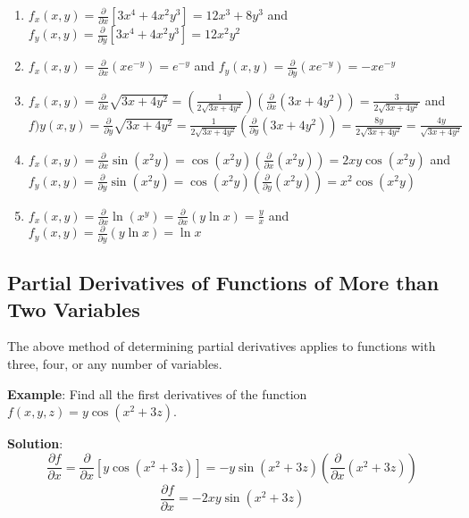 \begin{Answer}[ref = first]
\begin{enumerate}
    \item $f_x(x, y) = \frac{\partial}{\partial x} \left[ 3x^4 + 4x^2y^3 
    \right] = 12x^3 + 8y^3$ and $f_y(x, y) = \frac{\partial}{\partial y} 
    \left[ 3x^4 + 4x^2y^3 \right] = 12x^2y^2$
    \item $f_x(x, y) = \frac{\partial}{\partial x} \left(xe^{-y} \right) = 
    e^{-y}$ and $f_y(x, y) = \frac{\partial}{\partial y} \left(xe^{-y} \right) 
    = -xe^{-y}$
    \item $f_x(x, y) = \frac{\partial}{\partial x} \sqrt{3x + 4y^2} = \left( 
    \frac{1}{2\sqrt{3x + 4y^2}} \right) \left( \frac{\partial}{\partial x } 
    \left(3x + 4y^2 \right) \right) = \frac{3}{2\sqrt{3x + 4y^2}}$ and $f)y(x, 
    y) = \frac{\partial}{\partial y} \sqrt{3x + 4y^2} = \frac{1}{2\sqrt{3x + 
    4y^2}} \left( \frac{\partial}{\partial y} \left(3x + 4y^2 \right) \right) 
    = \frac{8y}{2\sqrt{3x + 4y^2}} = \frac{4y}{\sqrt{3x + 4y^2}}$
    \item $f_x(x, y) = \frac{\partial}{\partial x} \sin{ \left(x^2y \right)} = 
    \cos{\left( x^2y \right)} \left( \frac{\partial}{\partial x} \left(x^2y 
    \right) \right) = 2xy\cos{\left(x^2y \right)}$ and $f_y(x, y) = \frac{
    \partial}{\partial y} \sin{ \left(x^2y \right)} = \cos{ \left(x^2y \right)}
    \left( \frac{\partial}{\partial y} \left(x^2 y \right) \right) = x^2\cos{ 
    \left( x^2 y \right)}$
    \item $f_x(x, y) = \frac{\partial}{\partial x} \ln{ \left( x^y \right)} = 
    \frac{\partial}{\partial x} \left(y \ln{x} \right) = \frac{y}{x}$ and $f_y(
    x, y) = \frac{\partial}{\partial y} \left(y \ln{x} \right) = \ln{x}$
\end{enumerate}
\end{Answer}

\subsection{Partial Derivatives of Functions of More than Two Variables}
The above method of determining partial derivatives applies to functions with 
three, four, or any number of variables.

\textbf{Example}: Find all the first derivatives of the function $f(x, y, z) = 
y\cos{ \left(x^2 + 3z \right)}$. 

\textbf{Solution}: 
$$\frac{\partial f}{\partial x} = \frac{\partial}{\partial x} \left[ y \cos{ 
\left(x^2 + 3z \right)} \right] = -y\sin{\left(x^2 + 3z \right)} \left( \frac{
\partial}{\partial x} \left( x^2 + 3z \right) \right)$$
$$\frac{\partial f}{\partial x} = -2xy \sin{ \left( x^2 + 3z \right)}$$

